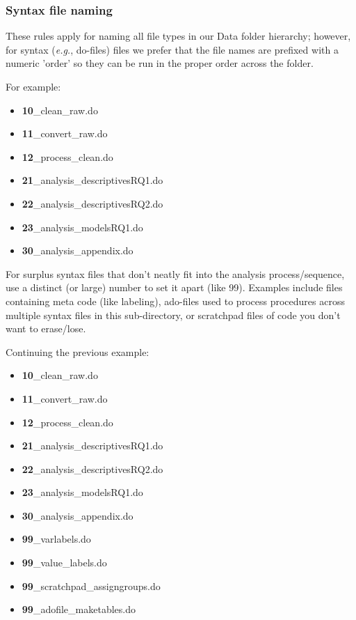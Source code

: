 \documentclass[11pt]{article}
\begin{document}
\subsubsection{Syntax file naming}
These rules apply for naming all file types in our Data folder hierarchy; however, for syntax ({\it{e.g.}}, do-files) files we prefer that the file names are prefixed with a numeric 'order' so they can be run in the proper order across the folder.

For example:
\linespread{1}
\begin{itemize}[label=]
	\item   \textbf{10}\_clean\_raw.do
	\item   \textbf{11}\_convert\_raw.do
	\item   \textbf{12}\_process\_clean.do
	\item   \textbf{21}\_analysis\_descriptivesRQ1.do
	\item   \textbf{22}\_analysis\_descriptivesRQ2.do
	\item   \textbf{23}\_analysis\_modelsRQ1.do
	\item   \textbf{30}\_analysis\_appendix.do
\end{itemize}
\linespread{1.25}

For surplus syntax files that don't neatly fit into the analysis process/sequence, use a distinct (or large) number to set it apart (like 99).  Examples include files containing meta code (like labeling), ado-files used to process procedures across multiple syntax files in this sub-directory, or scratchpad files of code you don't want to erase/lose.

Continuing the previous example:

\linespread{1}

\begin{itemize}[label=]
	\item   {\textcolor{gray!95!}{\textbf{10}\_clean\_raw.do}}
	\item    {\textcolor{gray!95!}{\textbf{11}\_convert\_raw.do}}
	\item    {\textcolor{gray!95!}{\textbf{12}\_process\_clean.do}}
	\item    {\textcolor{gray!95!}{\textbf{21}\_analysis\_descriptivesRQ1.do}}
	\item   {\textcolor{gray!95!}{\textbf{22}\_analysis\_descriptivesRQ2.do}}
	\item    {\textcolor{gray!95!}{\textbf{23}\_analysis\_modelsRQ1.do}}
	\item    {\textcolor{gray!95!}{\textbf{30}\_analysis\_appendix.do}}
	\item    {\textcolor{uscred}{\textbf{99}\_varlabels.do}}
	\item    {\textcolor{uscred}{\textbf{99}\_value\_labels.do}}
	\item    {\textcolor{uscred}{\textbf{99}\_scratchpad\_assigngroups.do}}
	\item    {\textcolor{uscred}{\textbf{99}\_adofile\_maketables.do}}
\end{itemize}
\linespread{1.25}
\end{document}
